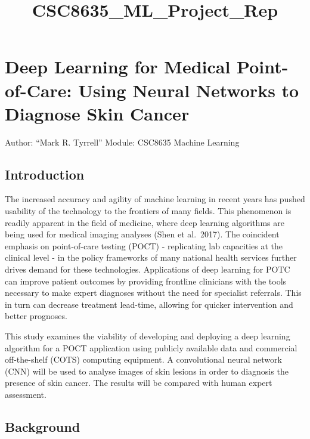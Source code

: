 \documentclass[11pt]{article}
\title{CSC8635\_ML\_Project\_Rep}
\begin{document}
    
    
    \maketitle
    
    

    
    \hypertarget{deep-learning-for-medical-point-of-care-using-neural-networks-to-diagnose-skin-cancer}{%
\section{Deep Learning for Medical Point-of-Care: Using Neural Networks
to Diagnose Skin
Cancer}\label{deep-learning-for-medical-point-of-care-using-neural-networks-to-diagnose-skin-cancer}}

Author: ``Mark R. Tyrrell'' Module: CSC8635 Machine Learning

\hypertarget{introduction}{%
\subsection{Introduction}\label{introduction}}

The increased accuracy and agility of machine learning in recent years
has pushed usability of the technology to the frontiers of many fields.
This phenomenon is readily apparent in the field of medicine, where deep
learning algorithms are being used for medical imaging analyses (Shen et
al.~2017). The coincident emphasis on point-of-care testing (POCT) -
replicating lab capacities at the clinical level - in the policy
frameworks of many national health services further drives demand for
these technologies. Applications of deep learning for POTC can improve
patient outcomes by providing frontline clinicians with the tools
necessary to make expert diagnoses without the need for specialist
referrals. This in turn can decrease treatment lead-time, allowing for
quicker intervention and better prognoses.

This study examines the viability of developing and deploying a deep
learning algorithm for a POCT application using publicly available data
and commercial off-the-shelf (COTS) computing equipment. A convolutional
neural network (CNN) will be used to analyse images of skin lesions in
order to diagnosis the presence of skin cancer. The results will be
compared with human expert assessment.

\hypertarget{background}{%
\subsection{Background}\label{background}}
\end{document}
